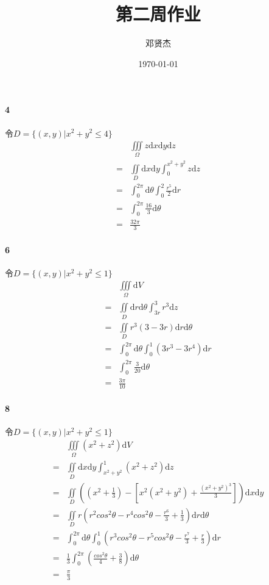 \documentclass[UTF8]{ctexart}
\title{第二周作业}
\author{邓贤杰}
\date{\today}
\begin{document}
    \maketitle
    \paragraph*{4}
    令$D=\{(x,y)| x^2 + y^2 \le 4\}$
    \begin{align*}
        &\iiint \limits_{\Omega} z \mathrm{d}x \mathrm{d}y \mathrm{d}z \\
        =& \iint \limits
        _D \mathrm{d}x \mathrm{d}y \int_{0}^{x^2+y^2} z \mathrm{d}z \\
        =& \int_{0}^{2\pi} \mathrm{d}\theta \int_{0}^{2} \frac{r^5}{2} \mathrm{d}r \\
        =& \int_{0}^{2\pi} \frac{16}{3} \mathrm{d}\theta \\
        =& \frac{32\pi}{3}  
    \end{align*}
\paragraph*{6}
令$D=\{(x,y)| x^2 + y^2 \le 1\}$
\begin{align*}
    &\iiint \limits_{\Omega} \mathrm{d}V \\
    =& \iint \limits_D \mathrm{d}r \mathrm{d}\theta \int_{3r}^{3} r^3 \mathrm{d}z \\
    =& \iint \limits_D r^3(3 - 3r)\mathrm{d}r \mathrm{d}\theta \\
    =& \int_{0}^{2\pi} \mathrm{d}\theta \int_{0}^{1} (3r^3 - 3r^4)\mathrm{d}r \\
    =& \int_{0}^{2\pi} \frac{3}{20} \mathrm{d}\theta \\
    =& \frac{3\pi}{10} 
\end{align*}
\paragraph*{8}
令$D=\{(x,y)| x^2 + y^2 \le 1\}$
\begin{align*}
    &\iiint \limits_{\Omega} (x^2+z^2)\mathrm{d}V \\
    =& \iint \limits_D \mathrm{d}x \mathrm{d}y \int_{x^2+y^2}^{1} (x^2+z^2)\mathrm{d}z \\
    =& \iint \limits_D \left((x^2+\frac{1}{3} )-[x^2(x^2+y^2)+\frac{(x^2+y^2)^3}{3}]\right)\mathrm{d}x \mathrm{d}y \\
    =& \iint \limits_D r(r^2cos^2\theta - r^4 cos^2\theta - \frac{r^6}{3} + \frac{1}{3}) \mathrm{d}r \mathrm{d}\theta \\
    =& \int_{0}^{2\pi} \mathrm{d}\theta\int_{0}^{1} \left(r^3cos^2\theta-r^5cos^2\theta - \frac{r^7}{3} + \frac{r}{3} \right) \mathrm{d}r \\
    =& \frac{1}{3} \int_{0}^{2\pi} (\frac{cos^2\theta}{4} + \frac{3}{8} ) \mathrm{d}\theta \\
    =& \frac{\pi}{3}
\end{align*}
\end{document}
